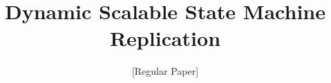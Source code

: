 \documentclass[conference]{IEEEtran}
\newcommand{\dssmrlong}{Dynamic Scalable State Machine Replication}
\begin{document}
\title{\dssmrlong}

\author{[Regular Paper]\\\vspace{20pt}}



\maketitle
\thispagestyle{plain}
\pagestyle{plain}
%













%


\newpage
\end{document}
